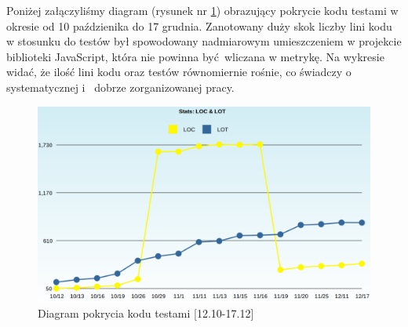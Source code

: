     Poniżej załączyliśmy diagram (rysunek nr \ref{fig:graph}) obrazujący pokrycie kodu testami w okresie od 10 paździenika do 17 grudnia. Zanotowany duży skok liczby lini kodu w stosunku do testów był spowodowany nadmiarowym umieszczeniem w projekcie biblioteki JavaScript, która nie powinna być wliczana w metrykę.
    Na wykresie widać, że ilość lini kodu oraz testów równomiernie rośnie, co świadczy o systematycznej i~ dobrze zorganizowanej pracy.
    \begin{figure}[h]
      \centering
      \includegraphics[scale=0.35]{images/LOC.png}
      \caption{Diagram pokrycia kodu testami [12.10-17.12]}
      \label{fig:graph}
    \end{figure}
  \clearpage
